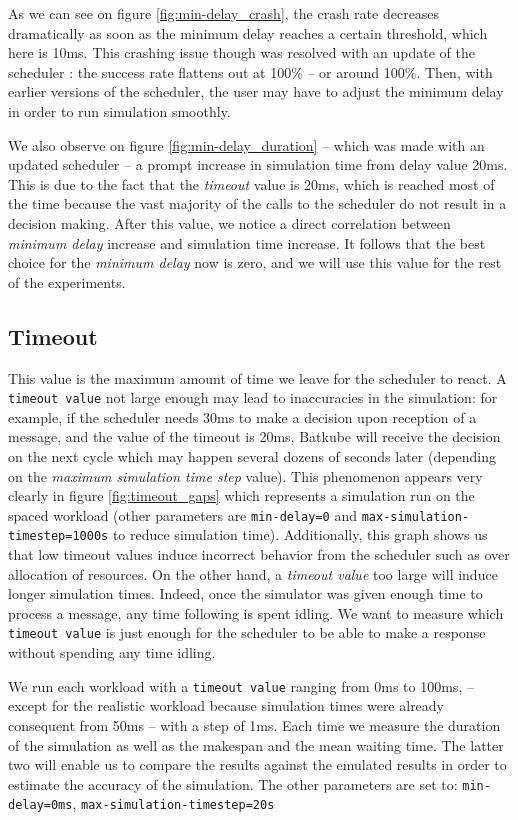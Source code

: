 As we can see on figure \ref{fig:min-delay_crash}, the crash rate decreases
dramatically as soon as the minimum delay reaches a certain threshold, which
here is 10ms.  This crashing issue though was resolved with an update of the
scheduler : the success rate flattens out at 100\% -- or around 100\%. Then,
with earlier versions of the scheduler, the user may have to adjust the minimum
delay in order to run simulation smoothly. 

We also observe on figure \ref{fig:min-delay_duration} -- which was made with
an updated scheduler -- a prompt increase in simulation time from delay value
20ms. This is due to the fact that the \textit{timeout} value is 20ms, which is
reached most of the time because the vast majority of the calls to the
scheduler do not result in a decision making. After this value, we notice a
direct correlation between \textit{minimum delay} increase and simulation time
increase. It follows that the best choice for the \textit{minimum delay} now is
zero, and we will use this value for the rest of the experiments.

\subsection{Timeout}

This value is the maximum amount of time we leave for the scheduler to react. A
\texttt{timeout value} not large enough may lead to inaccuracies in the
simulation: for example, if the scheduler needs 30ms to make a decision upon
reception of a message, and the value of the timeout is 20ms, Batkube will
receive the decision on the next cycle which may happen several dozens of
seconds later (depending on the \textit{maximum simulation time step} value).
This phenomenon appears very clearly in figure \ref{fig:timeout_gaps} which
represents a simulation run on the spaced workload (other parameters are
\texttt{min-delay=0} and \texttt{max-simulation-timestep=1000s} to reduce
simulation time). Additionally, this graph shows us that low timeout values
induce incorrect behavior from the scheduler such as over allocation of
resources.  On the other hand, a \textit{timeout value} too large will induce
longer simulation times. Indeed, once the simulator was given enough time to
process a message, any time following is spent idling. We want to measure which
\texttt{timeout value} is just enough for the scheduler to be able to make a
response without spending any time idling.

We run each workload with a \texttt{timeout value} ranging from 0ms to 100ms,
--except for the realistic workload because simulation times were already
consequent from 50ms -- with a step of 1ms. Each time we measure the duration
of the simulation as well as the makespan and the mean waiting time. The latter
two will enable us to compare the results against the emulated results in order
to estimate the accuracy of the simulation. The other parameters are set to:
\texttt{min-delay=0ms}, \texttt{max-simulation-timestep=20s}

